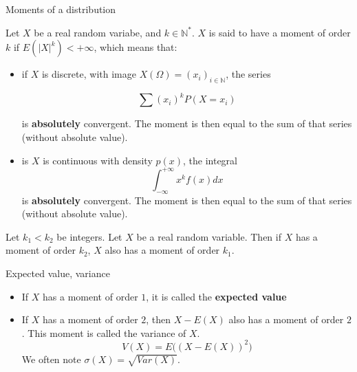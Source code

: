 \documentclass[
10pt, %
a4paper, %
oneside, %
headinclude,footinclude, %
BCOR5mm, %
]{scrartcl}
\begin{document}
\begin{definition}{Moments of a distribution}

    Let $X$ be a real random variabe, and $k\in \mathbb{N}^*$. $X$ is said to have a moment of order $k$ if $E(|X|^k)<+\infty$, which means that:
    \begin{itemize}
	\item if $X$ is discrete, with image $X(\Omega)=(x_i)_{i\in \mathbb{N} }$, the series

	    \begin{equation*}
		\sum (x_i)^kP(X=x_i)
	    \end{equation*}

	    is \textbf{{absolutely}}  convergent. The moment is then equal to the sum of that series (without absolute value).
	\item is $X$ is continuous with density $p(x)$, the integral
	    \begin{equation*}
	        \int^{+\infty}_{-\infty} x^kf(x)  dx 
	    \end{equation*}
	    is \textbf{{absolutely}}  convergent. The moment is then equal to the sum of that series (without absolute value).
    \end{itemize}
\end{definition}

\begin{proposition}

    Let $k_1<k_2$ be integers. Let $X$ be a real random variable. Then if $X$ has a moment of order $k_2$, $X$ also has a moment of order $k_1$.
    
\end{proposition}

\begin{definition}{Expected value, variance}

    \begin{itemize}
        \item If $X$ has a moment of order $1$, it is called the \textbf{{expected value}} 
	\item If $X$ has a moment of order $2$, then $X-E(X)$ also has a moment of order $2$. This moment is called the variance of $X$.
	    \begin{equation*}
		V(X)=E\big((X-E(X))^2\big)
	    \end{equation*}
	    We often note $\sigma(X)= \sqrt{Var(X)}$. 
    \end{itemize}

\end{definition}
\end{document}
